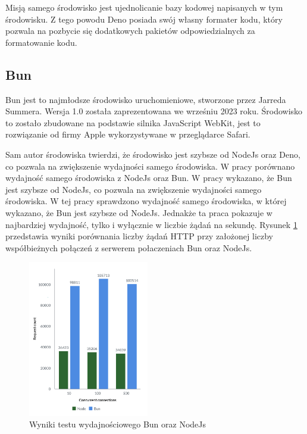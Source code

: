 Misją samego środowisko jest ujednolicanie bazy kodowej napisanych w tym środowisku. Z tego powodu Deno posiada swój własny formater kodu, który pozwala na pozbycie się dodatkowych pakietów odpowiedzialnych za formatowanie kodu. 

\subsection{Bun}
Bun \cite{bun} jest to najmłodsze środowisko uruchomieniowe, stworzone przez Jarreda Summera. Wersja 1.0 została zaprezentowana we wrześniu 2023 roku. Środowisko to zostało zbudowane na podstawie silnika JavaScript WebKit, jest to rozwiązanie od firmy Apple wykorzystywane w przeglądarce Safari.

Sam autor środowiska twierdzi, że środowisko jest szybsze od NodeJs oraz Deno, co pozwala na zwiększenie wydajności samego środowiska. W pracy \cite{NodeAndBun} porównano wydajność samego środowiska z NodeJs oraz Bun. W pracy wykazano, że Bun jest szybsze od NodeJs, co pozwala na zwiększenie wydajności samego środowiska. W tej pracy sprawdzono wydajność samego środowiska, w której wykazano, że Bun jest szybsze od NodeJs. Jednakże ta praca pokazuje w najbardziej wydajność, tylko i wyłącznie w liczbie żądań na sekundę. Rysunek \ref{fig:bun_vs_node} przedstawia wyniki porównania liczby żądań HTTP przy założonej liczby współbieżnych połączeń z serwerem połaczeniach Bun oraz NodeJs.

\begin{figure}[H]
  \centering
  \includegraphics[width=0.47\textwidth]{Figures/bun_bench_node.png}
  \caption{Wyniki testu wydajnościowego Bun oraz NodeJs \cite{bun_test}}
  \label{fig:bun_vs_node}
\end{figure}

